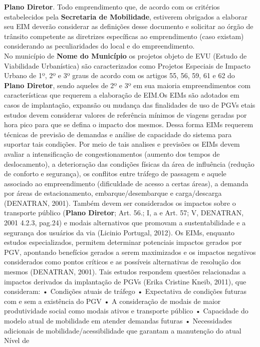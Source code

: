 \documentclass[]{article}
\begin{document}
\textbf{Plano Diretor}. Todo emprendimento que, de acordo com os
critérios estabelecidos pela \textbf{Secretaria de Mobilidade},
estiverem obrigados a elaborar seu EIM deverão considerar as definições
desse documento e solicitar ao órgão de trânsito competente as
diretrizes específicas ao emprendimento (caso existam) considerando as
peculiaridades do local e do empreendimento.\\
No município de \textbf{Nome do Município} os projetos objeto de EVU
(Estudo de Viabilidade Urbanística) são caracterizados como Projetos
Especiais de Impacto Urbano de 1º, 2º e 3º graus de acordo com os
artigos 55, 56, 59, 61 e 62 do \textbf{Plano Diretor}, sendo aqueles de
2º e 3º em sua maioria empreendimentos com características que requerem
a elaboração de EIM.Os EIMs são adotados em casos de implantação,
expansão ou mudança das finalidades de uso de PGVs etais estudos devem
considerar valores de referência mínimos de viagens geradas por hora
pico para que se defina o impacto dos mesmos. Dessa forma EIMs requerem
técnicas de previsão de demandas e análise de capacidade do sistema para
suportar tais condições. Por meio de tais analises e previsões os EIMs
devem avaliar a intensificação de congestionamentos (aumento dos tempos
de deslocamento), a deterioração das condições físicas da área de
influência (redução de conforto e segurança), os conflitos entre tráfego
de passagem e aquele associado ao empreendimento (dificuldade de acesso
a certas áreas), a demanda por áreas de estacionamento,
embarque/desembarque e carga/descarga (DENATRAN, 2001). Também devem ser
considerados os impactos sobre o transporte público (\textbf{Plano
Diretor}; Art. 56.; I, a e Art. 57; V, DENATRAN, 2001 4.2.3, pag.24) e
modais alternativos que promovam a sustentabilidade e a segurança dos
usuários da via (Licinio Portugal, 2012). Os EIMs, enquanto estudos
especializados, permitem determinar potenciais impactos gerados por PGV,
apontando benefícios gerados a serem maximizados e os impactos negativos
considerados como pontos críticos e as possíveis alternativas de
resolução dos mesmos (DENATRAN, 2001). Tais estudos respondem questões
relacionadas a impactos derivados da implantação de PGVs (Erika Cristine
Kneib, 2011), que consideram: • Condições atuais de tráfego •
Expectativa de condições futuras com e sem a existência do PGV • A
consideração de modais de maior produtividade social como modais ativos
e transporte público • Capacidade do modelo atual de mobilidade em
atender demandas futuras • Necessidades adicionais de
mobilidade/acessibilidade que garantam a manutenção do atual Nível de
\end{document}
